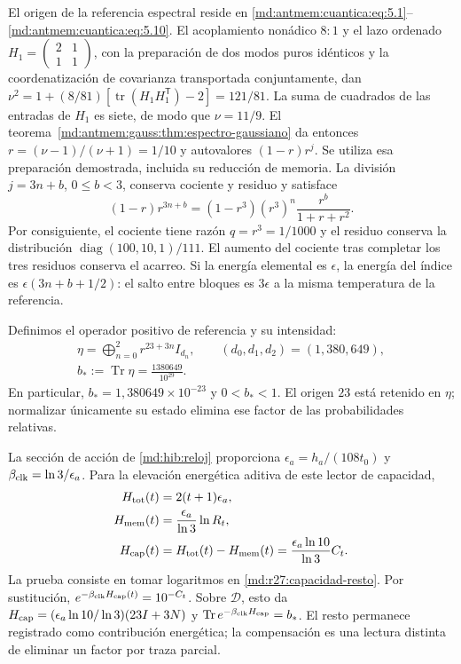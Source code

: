 El origen de la referencia espectral reside en
\eqref{md:antmem:cuantica:eq:5.1}--\eqref{md:antmem:cuantica:eq:5.10}.
El acoplamiento nonádico $8:1$ y el lazo ordenado
$H_1=\left(\begin{smallmatrix}2&1\\1&1\end{smallmatrix}\right)$,
con la preparación de dos modos puros idénticos y la coordenatización de covarianza
transportada conjuntamente, dan
$\nu^2=1+(8/81)[\operatorname{tr}(H_1H_1^{\mathsf T})-2]=121/81$.
La suma de cuadrados de las entradas de $H_1$ es siete, de modo que
$\nu=11/9$. El teorema~\ref{md:antmem:gauss:thm:espectro-gaussiano}
da entonces $r=(\nu-1)/(\nu+1)=1/10$ y autovalores $(1-r)r^j$.
Se utiliza esa preparación demostrada, incluida su reducción de memoria.
La división $j=3n+b$, $0\le b<3$, conserva cociente y residuo y satisface
\begin{equation}
 (1-r)r^{3n+b}=(1-r^3)(r^3)^n\frac{r^b}{1+r+r^2}.
 \label{md:r27:factorizacion}
\end{equation}
Por consiguiente, el cociente tiene razón $q=r^3=1/1000$ y el residuo conserva
la distribución $\operatorname{diag}(100,10,1)/111$. El aumento del cociente
tras completar los tres residuos conserva el acarreo. Si la energía elemental
es $\epsilon$, la energía del índice es $\epsilon(3n+b+1/2)$: el salto entre
bloques es $3\epsilon$ a la misma temperatura de la referencia.

Definimos el operador positivo de referencia y su intensidad:
\begin{equation}
 \begin{gathered}
 \eta=\bigoplus_{n=0}^{2}r^{23+3n}I_{d_n},\qquad
 (d_0,d_1,d_2)=(1,380,649),\\
 b_*:=\operatorname{Tr}\eta=\frac{1380649}{10^{29}}.
 \end{gathered}
 \label{md:r27:eta}
\end{equation}
En particular, $b_*=1{,}380649\times10^{-23}$ y $0<b_*<1$.
El origen $23$ está retenido en $\eta$; normalizar únicamente su estado
elimina ese factor de las probabilidades relativas.

La sección de acción de \eqref{md:hib:reloj} proporciona
$\epsilon_a=h_a/(108t_0)$ y $\beta_{\rm clk}=\ln3/\epsilon_a$.
Para la elevación energética aditiva de este lector de capacidad,
\begin{equation}
 \begin{split}
 H_{\rm tot}(t)&=2(t+1)\epsilon_a,\\
 H_{\rm mem}(t)&=\frac{\epsilon_a}{\ln3}\ln R_t,\\
 H_{\rm cap}(t)&=H_{\rm tot}(t)-H_{\rm mem}(t)
 =\frac{\epsilon_a\ln10}{\ln3}C_t.
 \end{split}
 \label{md:r27:energia-capacidad}
\end{equation}
La prueba consiste en tomar logaritmos en \eqref{md:r27:capacidad-resto}.
Por sustitución, $e^{-\beta_{\rm clk}H_{\rm cap}(t)}=10^{-C_t}$.
Sobre $\mathcal D$, esto da
$H_{\rm cap}=(\epsilon_a\ln10/\ln3)(23I+3N)$ y
$\operatorname{Tr}e^{-\beta_{\rm clk}H_{\rm cap}}=b_*$.
El resto permanece registrado como contribución energética; la compensación
es una lectura distinta de eliminar un factor por traza parcial.


